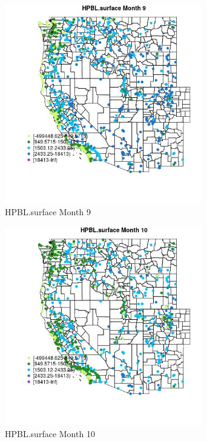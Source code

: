 \begin{figure} 
\centering  
\includegraphics[width=0.77\textwidth]{Code_Outputs/Report_ML_input_PM25_Step4_part_e_de_duplicated_aves_compiled_2019-05-21wNAs_MapObsMo9HPBLsurface.jpg} 
\caption{\label{fig:Report_ML_input_PM25_Step4_part_e_de_duplicated_aves_compiled_2019-05-21wNAsMapObsMo9HPBLsurface}HPBL.surface Month 9} 
\end{figure} 
 

\begin{figure} 
\centering  
\includegraphics[width=0.77\textwidth]{Code_Outputs/Report_ML_input_PM25_Step4_part_e_de_duplicated_aves_compiled_2019-05-21wNAs_MapObsMo10HPBLsurface.jpg} 
\caption{\label{fig:Report_ML_input_PM25_Step4_part_e_de_duplicated_aves_compiled_2019-05-21wNAsMapObsMo10HPBLsurface}HPBL.surface Month 10} 
\end{figure} 
 

